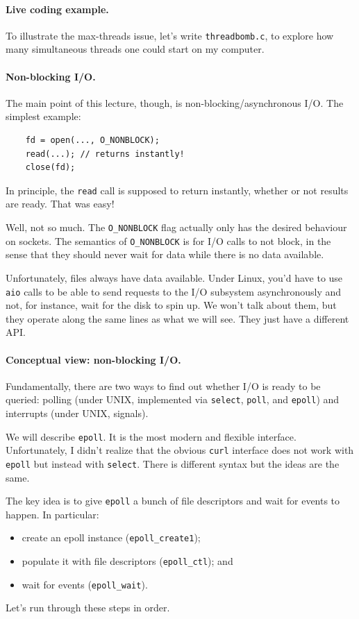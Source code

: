 \paragraph{Live coding example.} To illustrate the max-threads
issue, let's write {\tt threadbomb.c}, to explore how many simultaneous threads
one could start on my computer.

\paragraph{Non-blocking I/O.} The main point of this lecture, though,
is non-blocking/asynchronous I/O. The simplest example:

\begin{verbatim}
    fd = open(..., O_NONBLOCK);
    read(...); // returns instantly!
    close(fd);
\end{verbatim}

In principle, the {\tt read} call is supposed to return instantly,
whether or not results are ready. That was easy!

Well, not so much. The {\tt O\_NONBLOCK} flag actually only has the
desired behaviour on sockets. The semantics of {\tt O\_NONBLOCK} is
for I/O calls to not block, in the sense that they should never wait
for data while there is no data available.

Unfortunately, files always have data available. Under Linux, you'd have
to use {\tt aio} calls to be able to send requests to the I/O subsystem
asynchronously and not, for instance, wait for the disk to spin up.
We won't talk about them, but they operate along the same lines as what
we will see. They just have a different API.

\paragraph{Conceptual view: non-blocking I/O.} Fundamentally,
there are two ways to find out whether I/O is ready to be queried:
polling (under UNIX, implemented via {\tt select}, {\tt poll},
and {\tt epoll}) and interrupts (under UNIX, signals).


We will describe {\tt epoll}. It is the most modern and
flexible interface. Unfortunately, I didn't realize that the obvious
{\tt curl} interface does not work with {\tt epoll} but instead with
{\tt select}.  There is different syntax but the ideas are the same.

The key idea is to give {\tt epoll} a bunch of file descriptors and
wait for events to happen. In particular:
     \begin{itemize}
       \item create an epoll instance ({\tt epoll\_create1});
       \item populate it with file descriptors ({\tt epoll\_ctl}); and
       \item wait for events ({\tt epoll\_wait}).
     \end{itemize}
Let's run through these steps in order.

